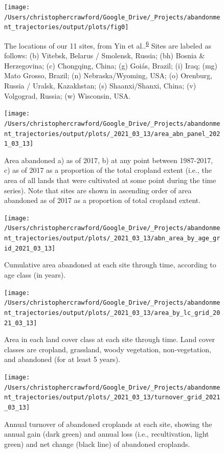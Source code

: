\documentclass[
]{article}
\begin{document}
\begin{figure}
\texttt{[image: /Users/christophercrawford/Google\_Drive/\_Projects/abandonment\_trajectories/output/plots/fig0]} \caption{The locations of our 11 sites, from Yin et al..\textsuperscript{\protect\hyperlink{ref-Yin2020}{6}} Sites are labeled as follows: (b) Vitebsk, Belarus / Smolensk, Russia; (bh) Bosnia \& Herzegovina; (c) Chongqing, China; (g) Goiás, Brazil; (i) Iraq; (mg) Mato Grosso, Brazil; (n) Nebraska/Wyoming, USA; (o) Orenburg, Russia / Uralsk, Kazakhstan; (s) Shaanxi/Shanxi, China; (v) Volgograd, Russia; (w) Wisconsin, USA.}\label{fig:global-map}
\end{figure}



\begin{figure}
\texttt{[image: /Users/christophercrawford/Google\_Drive/\_Projects/abandonment\_trajectories/output/plots/\_2021\_03\_13/area\_abn\_panel\_2021\_03\_13]} \caption{Area abandoned a) as of 2017, b) at any point between 1987-2017, c) as of 2017 as a proportion of the total cropland extent (i.e., the area of all lands that were cultivated at some point during the time series). Note that sites are shown in ascending order of area abandoned as of 2017 as a proportion of total cropland extent.}\label{fig:area-abn-panel}
\end{figure}



\begin{figure}
\texttt{[image: /Users/christophercrawford/Google\_Drive/\_Projects/abandonment\_trajectories/output/plots/\_2021\_03\_13/abn\_area\_by\_age\_grid\_2021\_03\_13]} \caption{Cumulative area abandoned at each site through time, according to age class (in years).}\label{fig:area-abn-by-age-class}
\end{figure}



\begin{figure}
\texttt{[image: /Users/christophercrawford/Google\_Drive/\_Projects/abandonment\_trajectories/output/plots/\_2021\_03\_13/area\_by\_lc\_grid\_2021\_03\_13]} \caption{Area in each land cover class at each site through time. Land cover classes are cropland, grassland, woody vegetation, non-vegetation, and abandoned (for at least 5 years).}\label{fig:area-by-lc}
\end{figure}



\begin{figure}
\texttt{[image: /Users/christophercrawford/Google\_Drive/\_Projects/abandonment\_trajectories/output/plots/\_2021\_03\_13/turnover\_grid\_2021\_03\_13]} \caption{Annual turnover of abandoned croplands at each site, showing the annual gain (dark green) and annual loss (i.e., recultivation, light green) and net change (black line) of abandoned croplands.}\label{fig:turnover-grid}
\end{figure}
\end{document}
